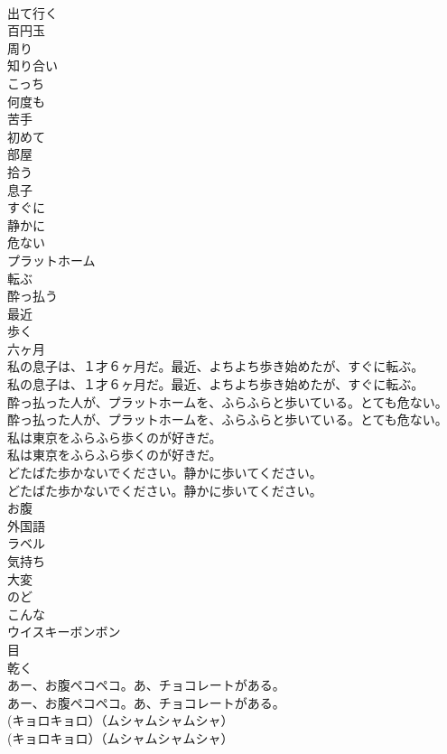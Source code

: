 \documentclass[8pt]{extreport}
\begin{document}
\begin{CJK}{UTF8}{min}
\\	出て行く
\\	百円玉
\\	周り
\\	知り合い
\\	こっち
\\	何度も
\\	苦手
\\	初めて
\\	部屋
\\	拾う
\\	息子
\\	すぐに
\\	静かに
\\	危ない
\\	プラットホーム
\\	転ぶ
\\	酔っ払う
\\	最近
\\	歩く
\\	六ヶ月
\\	私の息子は、１才６ヶ月だ。最近、よちよち歩き始めたが、すぐに転ぶ。	
\\	私の息子は、１才６ヶ月だ。最近、よちよち歩き始めたが、すぐに転ぶ。 
\\	酔っ払った人が、プラットホームを、ふらふらと歩いている。とても危ない。	
\\	酔っ払った人が、プラットホームを、ふらふらと歩いている。とても危ない。 
\\	私は東京をふらふら歩くのが好きだ。	
\\	私は東京をふらふら歩くのが好きだ。 
\\	どたばた歩かないでください。静かに歩いてください。	
\\	どたばた歩かないでください。静かに歩いてください。 
\\	お腹
\\	外国語
\\	ラベル
\\	気持ち
\\	大変
\\	のど
\\	こんな
\\	ウイスキーボンボン
\\	目
\\	乾く
\\	あー、お腹ペコペコ。あ、チョコレートがある。	
\\	あー、お腹ペコペコ。あ、チョコレートがある。 
\\	(キョロキョロ）（ムシャムシャムシャ）	
\\	(キョロキョロ）（ムシャムシャムシャ） 

\end{CJK}
\end{document}
